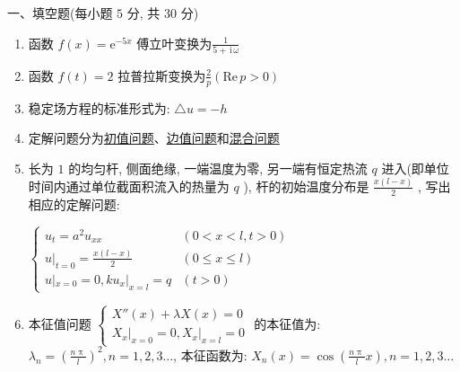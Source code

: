 \documentclass{article}
\theoremstyle{nonumberplain}
\newcommand{\ee}{\mathrm{e}}
\newcommand{\ii}{\,\mathrm{i}\,}
\begin{document}
    \begin{flushleft}
    	一、填空题(每小题 $5$ 分, 共 $30$ 分)
    \end{flushleft}
    \begin{enumerate}
    	\item 函数 $f(x)=\ee^{-5x}$ 傅立叶变换为\underline{\hspace{1pc}$\frac{1}{5+\ii\omega}$\hspace{1pc}}
    	
    	\item 函数 $f(t)=2$ 拉普拉斯变换为\underline{\hspace{1pc}$\frac{2}{p}(\mathrm{Re}\,p>0)$}
    	
    	\item 稳定场方程的标准形式为: \underline{\hspace{1pc}$\triangle u=-h$\hspace{1pc}}
    	
    	\item 定解问题分为\underline{\hspace{1pc}初值问题\hspace{1pc}}、\underline{\hspace{1pc}边值问题\hspace{1pc}}和\underline{\hspace{1pc}混合问题\hspace{1pc}}
    	
    	\item 长为 $1$ 的均匀杆, 侧面绝缘, 一端温度为零, 另一端有恒定热流 $q$ 进入(即单位时间内通过单位截面积流入的热量为 $q$ ), 杆的初始温度分布是 $\frac{x(l-x)}{2}$ , 写出相应的定解问题:
    	
    	\underline{\hspace{1pc}$\begin{cases}
    		u_{t}=a^2 u_{xx} & (0<x<l,t>0)\\
    		u|_{t=0}=\frac{x(l-x)}{2} & (0\leqslant x\leqslant l)\\
    		u|_{x=0}=0,ku_{x}|_{x=l}=q & (t>0)
    		\end{cases}$\hspace{1pc}}
    	
    	\item 本征值问题 $\begin{cases}
    	X''(x)+\lambda X(x)=0\\
    	\left. X_{x} \right|_{x=0}=0,\left. X_{x} \right|_{x=l}=0
    	\end{cases}$ 的本征值为: \underline{\hspace{1pc}$\lambda_{n}=\left( \frac{n\uppi}{l} \right)^2,n=1,2,3\ldots$\hspace{1pc}}, 本征函数为: \underline{\hspace{1pc}$X_{n}(x)=\cos\left( \frac{n\uppi}{l}x \right),n=1,2,3\ldots$\hspace{1pc}}
    \end{enumerate}
    
\end{document}

